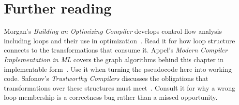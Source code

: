 \section{Further reading}
\label{sec:ch18-further-reading}

Morgan's \emph{Building an Optimizing Compiler} develops control-flow analysis including loops and their use in optimization~\cite{morgan-1998-optimizing}.
Read it for how loop structure connects to the transformations that consume it.
Appel's \emph{Modern Compiler Implementation in ML} covers the graph algorithms behind this chapter in implementable form~\cite{appel-1998-modern}.
Use it when turning the pseudocode here into working code.
Safonov's \emph{Trustworthy Compilers} discusses the obligations that transformations over these structures must meet~\cite{safonov-2010-trustworthy}.
Consult it for why a wrong loop membership is a correctness bug rather than a missed opportunity.
